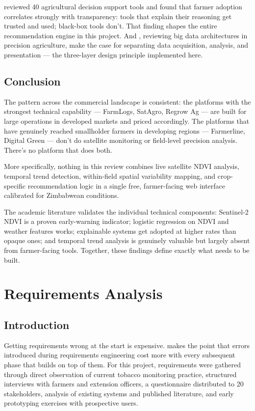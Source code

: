 \documentclass[12pt,a4paper]{report}
\begin{document}
\citet{rose2016} reviewed 40 agricultural decision support tools and found that farmer adoption correlates strongly with transparency: tools that explain their reasoning get trusted and used; black-box tools don't. That finding shapes the entire recommendation engine in this project. And \citet{wolfert2017}, reviewing big data architectures in precision agriculture, make the case for separating data acquisition, analysis, and presentation — the three-layer design principle implemented here.

\section{Conclusion}

The pattern across the commercial landscape is consistent: the platforms with the strongest technical capability — FarmLogs, SatAgro, Regrow Ag — are built for large operations in developed markets and priced accordingly. The platforms that have genuinely reached smallholder farmers in developing regions — Farmerline, Digital Green — don't do satellite monitoring or field-level precision analysis. There's no platform that does both.

More specifically, nothing in this review combines live satellite NDVI analysis, temporal trend detection, within-field spatial variability mapping, and crop-specific recommendation logic in a single free, farmer-facing web interface calibrated for Zimbabwean conditions.

The academic literature validates the individual technical components: Sentinel-2 NDVI is a proven early-warning indicator; logistic regression on NDVI and weather features works; explainable systems get adopted at higher rates than opaque ones; and temporal trend analysis is genuinely valuable but largely absent from farmer-facing tools. Together, these findings define exactly what needs to be built.

\chapter{Requirements Analysis}

\section{Introduction}

Getting requirements wrong at the start is expensive. \citet{sommerville2016} makes the point that errors introduced during requirements engineering cost more with every subsequent phase that builds on top of them. For this project, requirements were gathered through direct observation of current tobacco monitoring practice, structured interviews with farmers and extension officers, a questionnaire distributed to 20 stakeholders, analysis of existing systems and published literature, and early prototyping exercises with prospective users.
\end{document}

